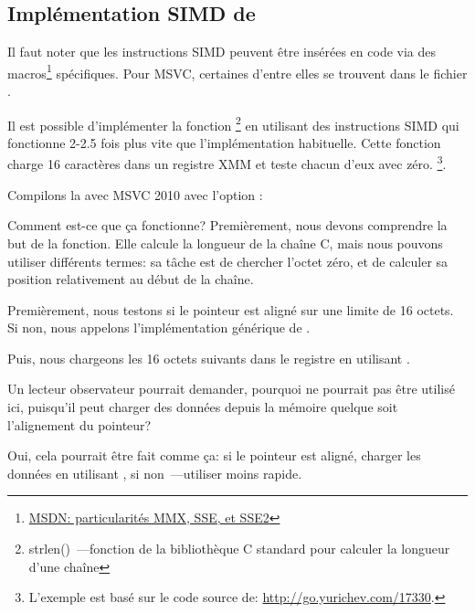 ﻿\subsection{Implémentation SIMD de \strlen}
\label{SIMD_strlen}

\newcommand{\URLMSDNSSE}{\href{http://go.yurichev.com/17262}{MSDN: particularités MMX, SSE, et SSE2}}

Il faut noter que les instructions \ac{SIMD} peuvent être insérées en code \CCpp via
des macros\footnote{\URLMSDNSSE} spécifiques.
Pour MSVC, certaines d'entre elles se trouvent dans le fichier .

\newcommand{\URLSTRLEN}{http://go.yurichev.com/17330}


Il est possible d'implémenter la fonction \strlen\footnote{strlen()~---fonction de
la bibliothèque C standard pour calculer la longueur d'une chaîne} en utilisant des
instructions SIMD qui fonctionne 2-2.5 fois plus vite que l'implémentation habituelle.
Cette fonction charge 16 caractères dans un registre XMM et teste chacun d'eux avec
zéro.
\footnote{L'exemple est basé sur le code source de: \url{\URLSTRLEN}.}.



Compilons la avec MSVC 2010 avec l'option \Ox:



Comment est-ce que ça fonctionne?
Premièrement, nous devons comprendre la but de la fonction.
Elle calcule la longueur de la chaîne C, mais nous pouvons utiliser différents termes:
sa tâche est de chercher l'octet zéro, et de calculer sa position relativement au
début de la chaîne.

Premièrement, nous testons si le pointeur  est aligné sur une limite de
16 octets.
Si non, nous appelons l'implémentation générique de \strlen.

Puis, nous chargeons les 16 octets suivants dans le registre  en utilisant
\MOVDQA.

Un lecteur observateur pourrait demander, pourquoi \MOVDQU ne pourrait pas être utilisé
ici, puisqu'il peut charger des données depuis la mémoire quelque soit l'alignement
du pointeur?

Oui, cela pourrait être fait comme ça: si le pointeur est aligné, charger les données
en utilisant \MOVDQA, si non~---utiliser \MOVDQU moins rapide.


